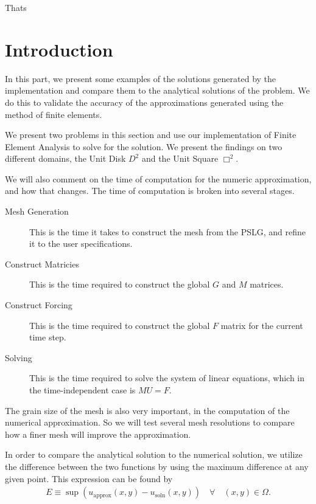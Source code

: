 Thats\documentclass[../fem.tex]{subfile}
\begin{document}
\section{Introduction}%
\label{sec:introduction_4}

In this part, we present some examples of the solutions generated by the
implementation and compare them to the analytical solutions of the problem. We
do this to validate the accuracy of the approximations generated using the
method of finite elements.

We present two problems in this section and use our implementation of Finite
Element Analysis to solve for the solution. We present the findings on two
different domains, the Unit Disk $D^2$ and the Unit Square $\Box^2$.

We will also comment on the time of computation for the numeric approximation,
and how that changes. The time of computation is broken into several stages.
\begin{description}
  \item[Mesh Generation] This is the time it takes to construct the mesh from
    the PSLG, and refine it to the user specifications.
  \item[Construct Matricies] This is the time required to construct the global
    $G$ and $M$ matrices.
  \item[Construct Forcing] This is the time required to construct the global
    $F$ matrix for the current time step.
  \item[Solving] This is the time required to solve the system of linear
    equations, which in the time-independent case is $MU=F$.
\end{description}

The grain size of the mesh is also very important, in the computation of the
numerical approximation. So we will test several mesh resolutions to compare
how a finer mesh will improve the approximation.

In order to compare the analytical solution to the numerical solution, we
utilize the difference between the two functions by using the maximum
difference at any given point. This expression can be found by
\begin{align*}
  E\equiv\sup\left(u_\text{approx}(x,y)-u_\text{soln}(x,y)\right)\quad\forall\quad
    (x,y)\in\Omega.
\end{align*}
\end{document}
